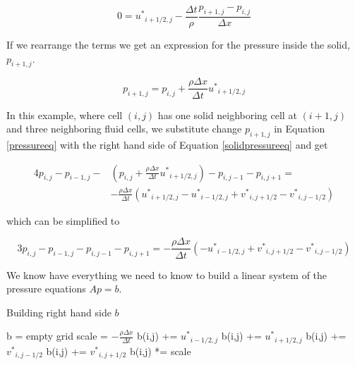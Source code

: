 \begin{equation}
0 = {u^*}_{i+1/2,j} - \frac{\Delta t }{\rho}\frac{p_{i+1,j} - p_{i,j}}{\Delta x}
\end{equation}

If we rearrange the terms we get an expression for the pressure inside the solid, $p_{i+1,j}$.

\begin{equation}
p_{i+1,j} = p_{i,j} + \frac{\rho \Delta x}{\Delta t}{u^*}_{i+1/2,j}
\label{solidpressureeq}
\end{equation}

In this example, where cell $(i,j)$ has one solid neighboring cell at $(i+1,j)$ and three neighboring fluid cells, we substitute change $p_{i+1,j}$ in Equation \ref{pressureeq} with the right hand side of Equation \ref{solidpressureeq} and get

\begin{equation}
\begin{split}
4p_{i,j} - p_{i-1,j} - &(p_{i,j} + \frac{\rho \Delta x}{\Delta t}{u^*}_{i+1/2,j}) - p_{i,j-1} - p_{i,j+1} = \\ &-\frac{\rho \Delta x}{\Delta t}({u^*}_{i+1/2,j} - {u^*}_{i-1/2,j} + {v^*}_{i,j+1/2} - {v^*}_{i,j-1/2})
\end{split}
\label{solidpressureeqfull}
\end{equation}

which can be simplified to

\begin{equation}
3p_{i,j} - p_{i-1,j} - p_{i,j-1} - p_{i,j+1} = -\frac{\rho \Delta x}{\Delta t}(- {u^*}_{i-1/2,j} + {v^*}_{i,j+1/2} - {v^*}_{i,j-1/2})
\end{equation}

We know have everything we need to know to build a linear system of the pressure equations $Ap = b$.

\begin{algorithm}
\caption{Building right hand side $b$}
\begin{algorithmic}
\STATE b = empty grid
\STATE scale = $-\frac{\rho\Delta x}{\Delta t}$
\STATE b(i,j) += ${u^*}_{i-1/2,j}$
\ENDIF
{}
\STATE b(i,j) += ${u^*}_{i+1/2,j}$
\ENDIF
{}
\STATE b(i,j) += ${v^*}_{i,j-1/2}$
\ENDIF
{}
\STATE b(i,j) += ${v^*}_{i,j+1/2}$
\ENDIF
\STATE b(i,j) *= scale
\ENDFOR
\ENDFOR
\end{algorithmic}
\label{build rhs}
\end{algorithm}

